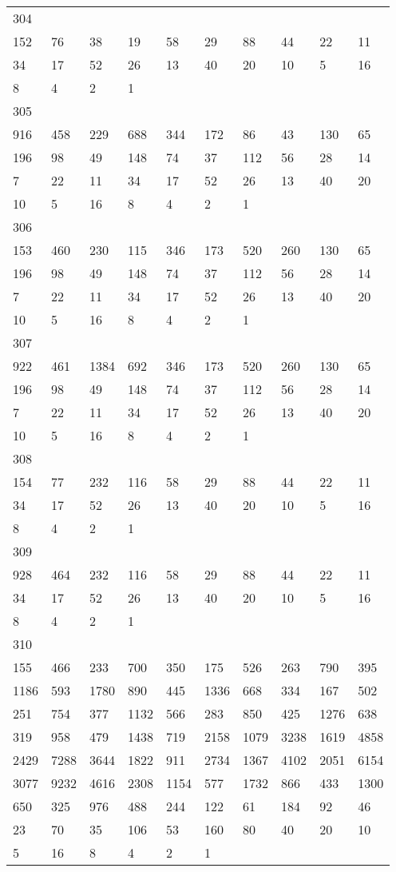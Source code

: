 \begin{longtable}{*{10}{l}}
304&&&&&&&&&\\
152& 76& 38& 19& 58& 29& 88& 44& 22& 11\\
34& 17& 52& 26& 13& 40& 20& 10& 5& 16\\
8& 4& 2& 1& \\

305&&&&&&&&&\\
916& 458& 229& 688& 344& 172& 86& 43& 130& 65\\
196& 98& 49& 148& 74& 37& 112& 56& 28& 14\\
7& 22& 11& 34& 17& 52& 26& 13& 40& 20\\
10& 5& 16& 8& 4& 2& 1& \\

306&&&&&&&&&\\
153& 460& 230& 115& 346& 173& 520& 260& 130& 65\\
196& 98& 49& 148& 74& 37& 112& 56& 28& 14\\
7& 22& 11& 34& 17& 52& 26& 13& 40& 20\\
10& 5& 16& 8& 4& 2& 1& \\

307&&&&&&&&&\\
922& 461& 1384& 692& 346& 173& 520& 260& 130& 65\\
196& 98& 49& 148& 74& 37& 112& 56& 28& 14\\
7& 22& 11& 34& 17& 52& 26& 13& 40& 20\\
10& 5& 16& 8& 4& 2& 1& \\

308&&&&&&&&&\\
154& 77& 232& 116& 58& 29& 88& 44& 22& 11\\
34& 17& 52& 26& 13& 40& 20& 10& 5& 16\\
8& 4& 2& 1& \\

309&&&&&&&&&\\
928& 464& 232& 116& 58& 29& 88& 44& 22& 11\\
34& 17& 52& 26& 13& 40& 20& 10& 5& 16\\
8& 4& 2& 1& \\

310&&&&&&&&&\\
155& 466& 233& 700& 350& 175& 526& 263& 790& 395\\
1186& 593& 1780& 890& 445& 1336& 668& 334& 167& 502\\
251& 754& 377& 1132& 566& 283& 850& 425& 1276& 638\\
319& 958& 479& 1438& 719& 2158& 1079& 3238& 1619& 4858\\
2429& 7288& 3644& 1822& 911& 2734& 1367& 4102& 2051& 6154\\
3077& 9232& 4616& 2308& 1154& 577& 1732& 866& 433& 1300\\
650& 325& 976& 488& 244& 122& 61& 184& 92& 46\\
23& 70& 35& 106& 53& 160& 80& 40& 20& 10\\
5& 16& 8& 4& 2& 1& \\


\end{longtable}
